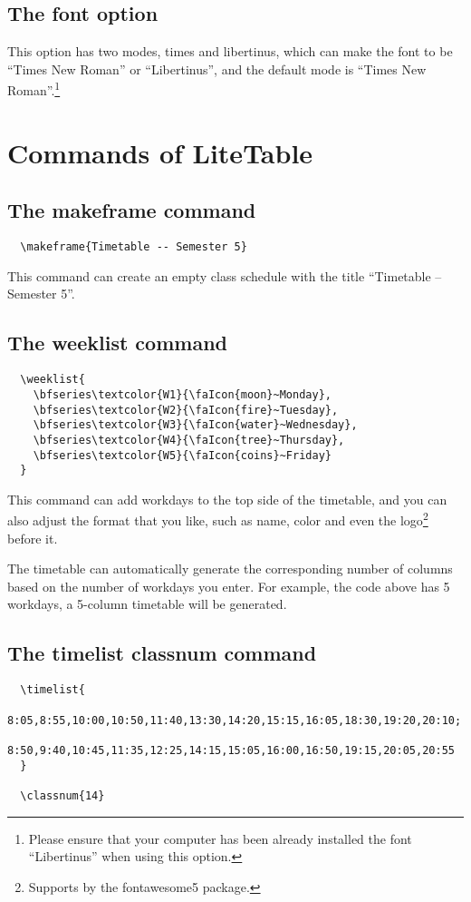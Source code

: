 \documentclass[11pt]{article}
\def\pkg#1{\texorpdfstring{\textcolor{pkgcolor}{\textsf{#1}}}{“#1”}}
\def\mode#1{\texorpdfstring{\textcolor{moducolor}{\textsf{#1}}}{“#1”}}
\def\cmd#1{\texorpdfstring{\textcolor{cmdcolor}{\textsf{#1}}}{“#1”}}
\begin{document}
\subsection{The \mode{font} option}
This option has two modes, \mode{times} and \mode{libertinus}, which can make the font to be ``Times New Roman'' or ``Libertinus'', and the default mode is ``Times New Roman''.\footnote{Please ensure that your computer has been already installed the font ``Libertinus'' when using this option.}

\section{Commands of \pkg{LiteTable}}

\subsection{The \cmd{makeframe} command}
\begin{verbatim}
  \makeframe{Timetable -- Semester 5}
\end{verbatim}

This command can create an empty class schedule with the title ``Timetable -- Semester 5''.

\subsection{The \cmd{weeklist} command}
\begin{verbatim}
  \weeklist{
    \bfseries\textcolor{W1}{\faIcon{moon}~Monday},
    \bfseries\textcolor{W2}{\faIcon{fire}~Tuesday},
    \bfseries\textcolor{W3}{\faIcon{water}~Wednesday},
    \bfseries\textcolor{W4}{\faIcon{tree}~Thursday},
    \bfseries\textcolor{W5}{\faIcon{coins}~Friday}
  }
\end{verbatim}

This command can add workdays to the top side of the timetable, and you can also adjust the format that you like, such as name, color and even the logo\footnote{Supports by the \pkg{fontawesome5} package.} before it.

The timetable can automatically generate the corresponding number of columns based on the number of workdays you enter. For example, the code above has 5 workdays, a 5-column timetable will be generated.

\subsection{The \cmd{timelist} \cmd{classnum} command}
\begin{verbatim}
  \timelist{
    8:05,8:55,10:00,10:50,11:40,13:30,14:20,15:15,16:05,18:30,19:20,20:10;
    8:50,9:40,10:45,11:35,12:25,14:15,15:05,16:00,16:50,19:15,20:05,20:55
  }

  \classnum{14}
\end{verbatim}
\end{document}
